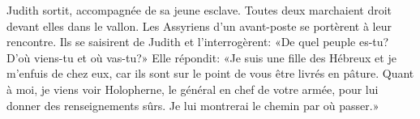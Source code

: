 Judith sortit, accompagnée de sa jeune esclave.
	Toutes deux marchaient droit devant elles dans le vallon.
Les Assyriens d’un avant-poste se portèrent à leur rencontre.
Ils se saisirent de Judith et l’interrogèrent:
	«De quel peuple es-tu? D’où viens-tu et où vas-tu?»
Elle répondit: «Je suis une fille des Hébreux et je m’enfuis de chez eux,
	car ils sont sur le point de vous être livrés en pâture.
Quant à moi, je viens voir Holopherne, le général en chef de votre armée,
	pour lui donner des renseignements sûrs.
	Je lui montrerai le chemin par où passer.»
